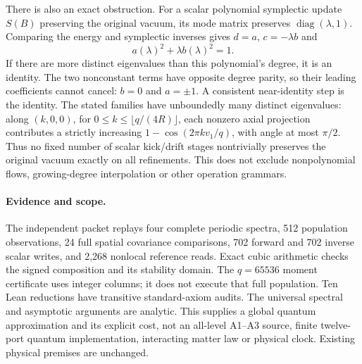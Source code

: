 There is also an exact obstruction. For a scalar polynomial symplectic
update $S(B)$ preserving the original vacuum, its mode matrix preserves
$\operatorname{diag}(\lambda,1)$. Comparing the energy and symplectic
inverses gives $d=a$, $c=-\lambda b$ and
\[
 a(\lambda)^2+\lambda b(\lambda)^2=1.
\]
If there are more distinct eigenvalues than this polynomial's degree, it is
an identity. The two nonconstant terms have opposite degree parity, so their
leading coefficients cannot cancel: $b=0$ and $a=\pm1$. A consistent
near-identity step is the identity. The stated families have unboundedly
many distinct eigenvalues: along $(k,0,0)$, for
$0\le k\le\lfloor q/(4R)\rfloor$, each nonzero axial projection contributes
a strictly increasing $1-\cos(2\pi k v_1/q)$, with angle at most $\pi/2$.
Thus no fixed number of scalar kick/drift stages nontrivially preserves the
original vacuum exactly on all refinements. This does not exclude
nonpolynomial flows, growing-degree interpolation or other operation grammars.

\paragraph{Evidence and scope.}
The independent packet replays four complete periodic spectra, 512
population observations, 24 full spatial covariance comparisons, 702 forward
and 702 inverse scalar writes, and 2,268 nonlocal reference reads. Exact
cubic arithmetic checks the signed composition and its stability domain.
The $q=65536$ moment certificate uses integer columns; it does not execute
that full population. Ten Lean reductions have transitive standard-axiom
audits. The universal spectral and asymptotic arguments are analytic.
This supplies a global quantum approximation and its explicit cost, not an
all-level A1--A3 source, finite twelve-port quantum implementation, interacting
matter law or physical clock. Existing physical premises are unchanged.
